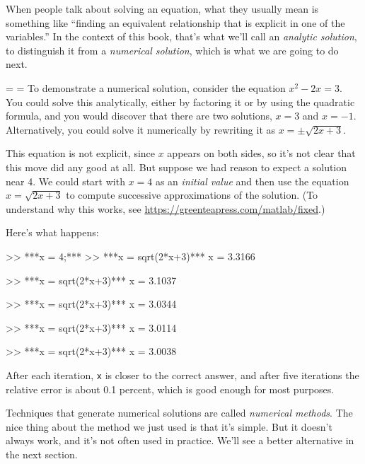 When people talk about solving an equation, what they usually mean
is something like ``finding an equivalent relationship that is
explicit in one of the variables.''  In the context of this book,
that's what we'll call an \emph{analytic \mbox{solution}}, to distinguish
it from a \emph{numerical solution}, which is what we are going to
do next.


{\binoppenalty=\maxdimen%
\relpenalty=\maxdimen%
To demonstrate a numerical solution, consider the equation $x^2 - 2x = 3$.  You could solve this analytically, either by factoring it or by
using the quad\-ratic formula, and you would discover that there are
two solutions, $x=3$ and $x=-1$.  Alternatively, you could solve it
numerically by rewriting it as $x = \pm \sqrt{2x+3}$.}

This equation is not explicit, since $x$ appears on both sides, so
it's not clear that this move did any good at all.  But suppose we had
reason to expect a solution near 4.
We could start with $x=4$ as an \emph{initial value} and then use
the equation $x = \sqrt{2x+3}$ to compute successive
approximations of the solution. (To understand why this
works, see \url{https://greenteapress.com/matlab/fixed}.)


Here's what happens:

\begin{code}
>> ***x = 4;***
>> ***x = sqrt(2*x+3)***
x = 3.3166

>> ***x = sqrt(2*x+3)***
x = 3.1037

>> ***x = sqrt(2*x+3)***
x = 3.0344

>> ***x = sqrt(2*x+3)***
x = 3.0114

>> ***x = sqrt(2*x+3)***
x = 3.0038
\end{code}

After each iteration, \lstinline{x} is closer to the correct answer,
and after five iterations the relative error is about 0.1 percent, which
is good enough for most purposes.


Techniques that generate numerical solutions are called
\emph{numerical \mbox{methods}}.  
The nice thing about the method we just used is that it's simple.  But it doesn't always
work, and it's not often used in practice.
We'll see a better alternative in the next section.


